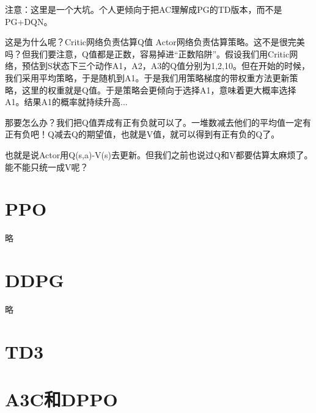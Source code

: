 \documentclass[12pt]{article}
\begin{document}
注意：这里是一个大坑。个人更倾向于把AC理解成PG的TD版本，而不是PG+DQN。

这是为什么呢？Critic网络负责估算Q值 Actor网络负责估算策略。这不是很完美吗？但我们要注意，Q值都是正数，容易掉进“正数陷阱”。假设我们用Critic网络，预估到S状态下三个动作A1，A2，A3的Q值分别为1,2,10。但在开始的时候，我们采用平均策略，于是随机到A1。于是我们用策略梯度的带权重方法更新策略，这里的权重就是Q值。于是策略会更倾向于选择A1，意味着更大概率选择A1。结果A1的概率就持续升高...

那要怎么办？我们把Q值弄成有正有负就可以了。一堆数减去他们的平均值一定有正有负吧！Q减去Q的期望值，也就是V值，就可以得到有正有负的Q了。

也就是说Actor用Q(s,a)-V(s)去更新。但我们之前也说过Q和V都要估算太麻烦了。能不能只统一成V呢？

\section{PPO}
略

\section{DDPG}
略


\section{TD3}


\section{A3C和DPPO}
























\end{document}
